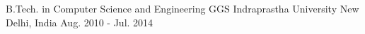 

\begin{cventries}

  \cventry
    {B.Tech. in Computer Science and Engineering} %
    {GGS Indraprastha University} %
    {New Delhi, India} %
    {Aug. 2010 - Jul. 2014} %

\end{cventries}
